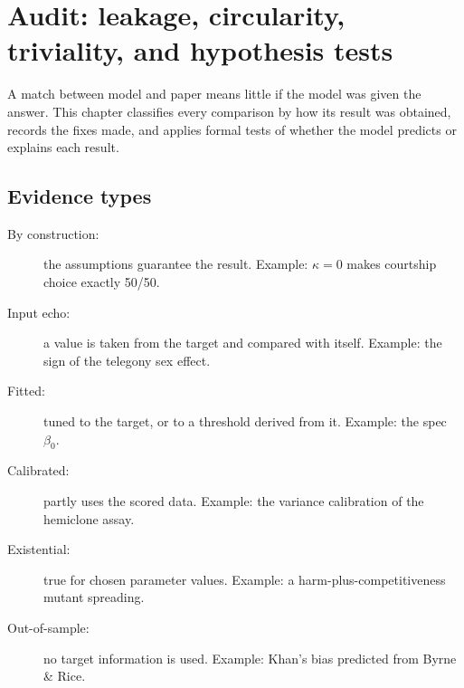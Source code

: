 \chapter{Audit: leakage, circularity, triviality, and hypothesis tests}\label{ch:audit}
A match between model and paper means little if the model was given the answer. This chapter classifies every comparison by how its result was obtained, records the fixes made, and applies formal tests of whether the model predicts or explains each result.

\section{Evidence types}
\begin{description}
\item[By construction:] the assumptions guarantee the result. Example: $\kappa=0$ makes courtship choice exactly 50/50.
\item[Input echo:] a value is taken from the target and compared with itself. Example: the sign of the telegony sex effect.
\item[Fitted:] tuned to the target, or to a threshold derived from it. Example: the spec $\beta_0$.
\item[Calibrated:] partly uses the scored data. Example: the variance calibration of the hemiclone assay.
\item[Existential:] true for chosen parameter values. Example: a harm-plus-competitiveness mutant spreading.
\item[Out-of-sample:] no target information is used. Example: Khan's bias predicted from Byrne \& Rice.
\end{description}

